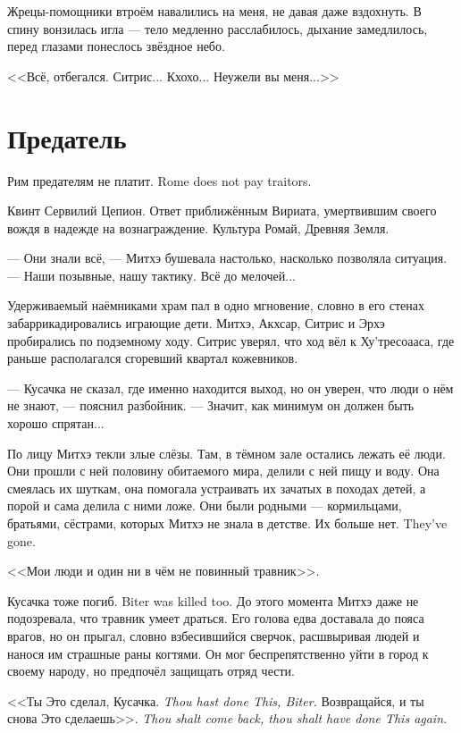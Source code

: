 Жрецы-помощники втроём навалились на меня, не давая даже вздохнуть.
В спину вонзилась игла --- тело медленно расслабилось, дыхание замедлилось, перед глазами понеслось звёздное небо.

<<Всё, отбегался.
Ситрис... Кхохо... Неужели вы меня...>>

\section{Предатель}

\epigraph{
{Рим предателям не платит.}
{Rome does not pay traitors.}
}{Квинт Сервилий Цепион.
Ответ приближённым Вириата, умертвившим своего вождя в надежде на вознаграждение.
Культура Ромай, Древняя Земля.}

--- Они знали всё, --- Митхэ бушевала настолько, насколько позволяла ситуация.
--- Наши позывные, нашу тактику.
Всё до мелочей...

Удерживаемый наёмниками храм пал в одно мгновение, словно в его стенах забаррикадировались играющие дети.
Митхэ, Акхсар, Ситрис и Эрхэ пробирались по подземному ходу.
Ситрис уверял, что ход вёл к Ху'тресоааса, где раньше располагался сгоревший квартал кожевников.

--- Кусачка не сказал, где именно находится выход, но он уверен, что люди о нём не знают, --- пояснил разбойник.
--- Значит, как минимум он должен быть хорошо спрятан...

По лицу Митхэ текли злые слёзы.
Там, в тёмном зале остались лежать её люди.
Они прошли с ней половину обитаемого мира, делили с ней пищу и воду.
Она смеялась их шуткам, она помогала устраивать их зачатых в походах детей, а порой и сама делила с ними ложе.
Они были родными --- кормильцами, братьями, сёстрами, которых Митхэ не знала в детстве.
{Их больше нет.}
{They've gone.}

<<Мои люди и один ни в чём не повинный травник>>.

{Кусачка тоже погиб.}
{Biter was killed too.}
До этого момента Митхэ даже не подозревала, что травник умеет драться.
Его голова едва доставала до пояса врагов, но он прыгал, словно взбесившийся сверчок, расшвыривая людей и нанося им страшные раны когтями.
Он мог беспрепятственно уйти в город к своему народу, но предпочёл защищать отряд чести.

{<<Ты Это сделал, Кусачка.}
{\textit{Thou hast done This, Biter.}}
{Возвращайся, и ты снова Это сделаешь>>.}
{\textit{Thou shalt come back, thou shalt have done This again.}}

